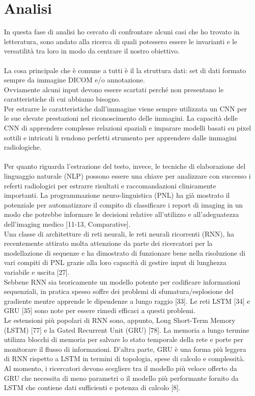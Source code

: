 \documentclass[12pt,a4paper]{report}
\begin{document}
\section{Analisi}
In questa fase di analisi ho cercato di confrontare alcuni casi che ho trovato in letteratura, sono andato alla ricerca di quali potessero essere le invarianti e le versatilità tra loro in modo da centrare il nostro obiettivo.\\
\\
La cosa principale che è comune a tutti è il la struttura dati: set di dati formato sempre  da immagine DICOM e/o annotazione.\\
Ovviamente alcuni input devono essere scartati perché non presentano le caratteristiche di cui abbiamo bisogno.\\
Per estrarre le caratteristiche dall’immagine viene sempre utilizzata un CNN per le sue elevate prestazioni nel riconoscimento delle immagini. La capacità delle CNN di apprendere complesse relazioni spaziali e
imparare modelli basati su pixel sottili e intricati li rendono perfetti strumento per apprendere dalle immagini radiologiche. \\
\\
Per quanto riguarda l'estrazione del testo, invece, le tecniche di elaborazione del linguaggio naturale (NLP) possono essere una chiave per analizzare con successo i referti radiologici per estrarre risultati e raccomandazioni clinicamente importanti. La programmazione neuro-linguistica (PNL) ha già mostrato il potenziale per automatizzare il compito di classificare i report di imaging in un modo che potrebbe informare le decisioni relative all'utilizzo e all'adeguatezza dell'imaging medico [11-13, Comparative].\\
Una classe di architetture di reti neurali, le reti neurali ricorrenti (RNN), ha recentemente attirato molta attenzione da parte dei ricercatori per la modellazione di sequenze e ha dimostrato di funzionare bene nella risoluzione di vari compiti di PNL grazie alla loro capacità di gestire input di lunghezza variabile e uscita [27].\\
Sebbene RNN sia teoricamente un modello potente per codificare informazioni sequenziali, in pratica spesso soffre dei problemi di sfumatura/esplosione del gradiente mentre apprende le dipendenze a lungo raggio [33]. Le reti LSTM [34] e GRU [35] sono note per essere rimedi efficaci a questi problemi.\\
Le estensioni più popolari di RNN sono, appunto, Long Short-Term Memory (LSTM) [77] e la Gated Recurrent Unit (GRU) [78]. La memoria a lungo termine utilizza blocchi di memoria per salvare lo stato temporale della rete e porte per monitorare il flusso di informazioni. D'altra parte, GRU è una forma più leggera di RNN rispetto a LSTM in termini di topologia, spese di calcolo e complessità. Al momento, i ricercatori devono scegliere tra il modello più veloce offerto da GRU che necessita di meno parametri o il modello più performante fornito da LSTM che contiene dati sufficienti e potenza di calcolo [8].\\
\end{document}
